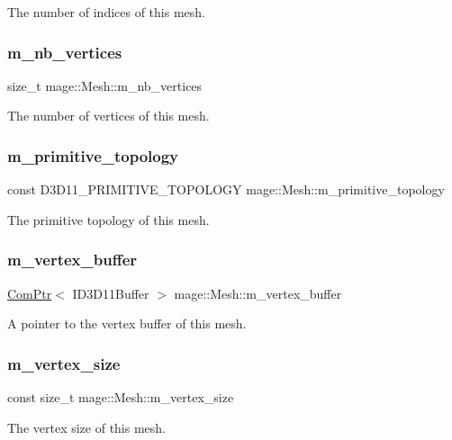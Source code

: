 The number of indices of this mesh. \hypertarget{classmage_1_1_mesh_a5a04aa73e98c75dd5b8929296c3af9bb}{}\label{classmage_1_1_mesh_a5a04aa73e98c75dd5b8929296c3af9bb} 
\subsubsection{\texorpdfstring{m\+\_\+nb\+\_\+vertices}{m\_nb\_vertices}}
{\footnotesize\ttfamily size\+\_\+t mage\+::\+Mesh\+::m\+\_\+nb\+\_\+vertices\hspace{0.3cm}{\ttfamily [private]}}

The number of vertices of this mesh. \hypertarget{classmage_1_1_mesh_a329fab0ad24e11b73a8981c6d09a0c7c}{}\label{classmage_1_1_mesh_a329fab0ad24e11b73a8981c6d09a0c7c} 
\subsubsection{\texorpdfstring{m\+\_\+primitive\+\_\+topology}{m\_primitive\_topology}}
{\footnotesize\ttfamily const D3\+D11\+\_\+\+P\+R\+I\+M\+I\+T\+I\+V\+E\+\_\+\+T\+O\+P\+O\+L\+O\+GY mage\+::\+Mesh\+::m\+\_\+primitive\+\_\+topology\hspace{0.3cm}{\ttfamily [private]}}

The primitive topology of this mesh. \hypertarget{classmage_1_1_mesh_af5ae74887eb330201829477cf772ba6e}{}\label{classmage_1_1_mesh_af5ae74887eb330201829477cf772ba6e} 
\subsubsection{\texorpdfstring{m\+\_\+vertex\+\_\+buffer}{m\_vertex\_buffer}}
{\footnotesize\ttfamily \hyperlink{namespacemage_ae74f374780900893caa5555d1031fd79}{Com\+Ptr}$<$ I\+D3\+D11\+Buffer $>$ mage\+::\+Mesh\+::m\+\_\+vertex\+\_\+buffer\hspace{0.3cm}{\ttfamily [protected]}}

A pointer to the vertex buffer of this mesh. \hypertarget{classmage_1_1_mesh_ab3ebdfffca054f32ac69e47c486d57b1}{}\label{classmage_1_1_mesh_ab3ebdfffca054f32ac69e47c486d57b1} 
\subsubsection{\texorpdfstring{m\+\_\+vertex\+\_\+size}{m\_vertex\_size}}
{\footnotesize\ttfamily const size\+\_\+t mage\+::\+Mesh\+::m\+\_\+vertex\+\_\+size\hspace{0.3cm}{\ttfamily [private]}}

The vertex size of this mesh. 